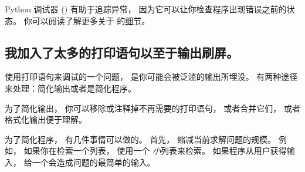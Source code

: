 
Python 调试器 () 有助于追踪异常， 因为它可以让你检查程序出现错误之前的状态。  
你可以阅读了解更多关于  的\href{https://docs.python.org/3/library/pdb.html}{细节}。  

\subsection{我加入了太多的打印语句以至于输出刷屏。}



使用打印语句来调试的一个问题， 是你可能会被泛滥的输出所埋没。  
有两种途径来处理：简化输出或者是简化程序。  


为了简化输出， 你可以移除或注释掉不再需要的打印语句， 或者合并它们， 或者格式化输出便于理解。  


为了简化程序， 有几件事情可以做的。  首先， 缩减当前求解问题的规模。  
例如， 如果你在检索一个列表， 使用一个 {\em 小}列表来检索。  
如果程序从用户获得输入， 给一个会造成问题的最简单的输入。  


